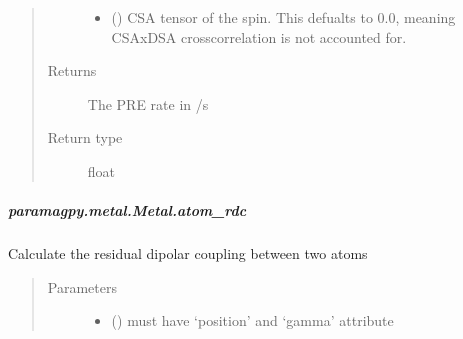 \documentclass[a4paper,10pt,english,openany,oneside]{sphinxmanual}
\begin{document}
\begin{fulllineitems}
\begin{fulllineitems}
\begin{fulllineitems}
\begin{quote}
\begin{description}
\begin{itemize}
\item {} 
\sphinxAtStartPar
{} (\sphinxstyleliteralemphasis{\sphinxupquote{ (}}\sphinxstyleliteralemphasis{\sphinxupquote{,}}\sphinxstyleliteralemphasis{\sphinxupquote{) }}\sphinxstyleliteralemphasis{\sphinxupquote{(}}\sphinxstyleliteralemphasis{\sphinxupquote{)}}) \textendash{} CSA tensor of the spin.
This defualts to 0.0, meaning CSAxDSA crosscorrelation is
not accounted for.

\end{itemize}

\item[{Returns}] \leavevmode
\sphinxAtStartPar
{} \textendash{} The PRE rate in /s

\item[{Return type}] \leavevmode
\sphinxAtStartPar
float

\end{description}\end{quote}

\end{fulllineitems}



\subparagraph{paramagpy.metal.Metal.atom\_rdc}
\label{\detokenize{reference/generated/paramagpy.metal.Metal.atom_rdc:paramagpy-metal-metal-atom-rdc}}\label{\detokenize{reference/generated/paramagpy.metal.Metal.atom_rdc::doc}}

\begin{fulllineitems}
\label{\detokenize{reference/generated/paramagpy.metal.Metal.atom_rdc:paramagpy.metal.Metal.atom_rdc}}
\sphinxAtStartPar
Calculate the residual dipolar coupling between two atoms
\begin{quote}\begin{description}
\item[{Parameters}] \leavevmode\begin{itemize}
\item {} 
\sphinxAtStartPar
{} () \textendash{} must have ‘position’ and ‘gamma’ attribute


\end{itemize}
\end{description}
\end{quote}
\end{fulllineitems}
\end{fulllineitems}
\end{fulllineitems}
\end{document}
